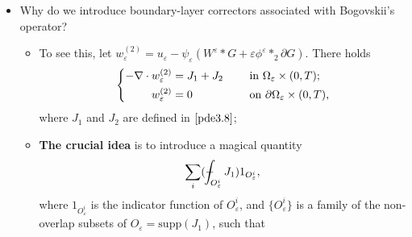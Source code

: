 \documentclass[13pt,CJK]{article}
\theoremstyle{plain}                       %
\theoremstyle{remark}
\numberwithin{equation}{section}
\def\Xint#1{\mathchoice
  {\XXint\displaystyle\textstyle{#1}}%
  {\XXint\textstyle\scriptstyle{#1}}%
  {\XXint\scriptstyle\scriptscriptstyle{#1}}%
  {\XXint\scriptscriptstyle\scriptscriptstyle{#1}}%
  \!\int}
\def\XXint#1#2#3{{\setbox0=\hbox{$#1{#2#3}{\int}$}
  \vcenter{\hbox{$#2#3$}}\kern-.5\wd0}}
\def\dashint{\Xint-}
\begin{document}
\begin{itemize}
\begin{itemize}
$\varepsilon(\nabla\cdot\phi)^\varepsilon*_{2}\partial F$, further deriving that
\begin{equation*}
  \nabla\cdot \big( w_\varepsilon^{(1)}
  -\varepsilon
  \phi^\varepsilon*_{2}\partial F \big) =
  -\varepsilon\phi^\varepsilon*_{2}\partial^2 F.
\end{equation*}
Theoretically, this expansion can provide a first-order convergence rate. But for the sake of simplicity, the above formula does not take the cut-off function into account. A more detailed discussion on this is scheduled for Remark $\ref{remark:3.1}$, where we will further touch on the concept of the flux corrector.
%
%
  \end{itemize}
  \item Why do we introduce boundary-layer correctors associated with Bogovskii's  operator?
  \begin{itemize}
    \item To see this, let $w_\varepsilon^{(2)} = u_{\varepsilon}-\psi_{\varepsilon}
(W^{\varepsilon}\ast G+\varepsilon
\phi^\varepsilon\ast_{2} \partial G)$. There holds
\begin{equation}\label{pde:B}
\left\{\begin{aligned}
-\nabla\cdot w_\varepsilon^{(2)}&=J_1+J_2
&~&\text{\quad in~} \Omega_{\varepsilon}\times(0,T); \\
w_\varepsilon^{(2)} &=0
&~&\text{\quad on~} \partial\Omega_\varepsilon\times(0,T),
\end{aligned}\right.
\end{equation}
where $J_1$ and $J_2$ are defined in $\eqref{pde3.8}$;
    \item \textbf{The crucial idea} is to introduce a magical quantity
\begin{equation*}
   \sum_{i} (\dashint_{O_{\varepsilon}^i}J_1)
1_{O_{\varepsilon}^i},
\end{equation*}
where $1_{O_{\varepsilon}^i}$ is the indicator function of $O_{\varepsilon}^i$,
and $\{O_{\varepsilon}^i\}$ is a family of the non-overlap subsets of $O_\varepsilon =\text{supp}(J_1)$, such that
\begin{equation}\label{k-5}

\end{equation}
\end{itemize}
\end{itemize}
\end{document}
